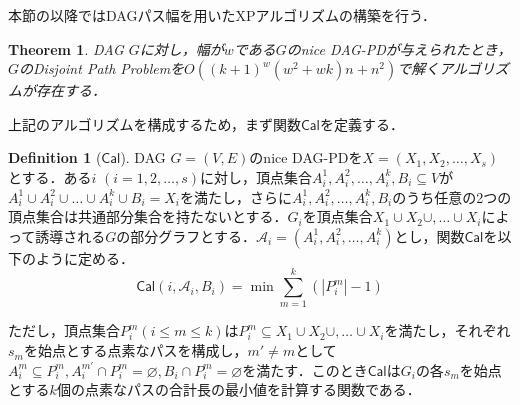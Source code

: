 \documentclass[master]{kuisthesis}		%
\theoremstyle{plain}
\newtheorem{theorem}{Theorem}
\theoremstyle{definition}
\newtheorem{definition*}{Definition}
\begin{document}
本節の以降ではDAGパス幅を用いたXPアルゴリズムの構築を行う．

\begin{theorem}
    DAG $G$に対し，幅が$w$である$G$のnice DAG-PDが与えられたとき，$G$のDisjoint Path Problemを$O((k+1)^w(w^2+wk)n+n^2)$で解くアルゴリズムが存在する．
\end{theorem}

上記のアルゴリズムを構成するため，まず関数$\mathsf{Cal}$を定義する．

\begin{definition*}[$\mathsf{Cal}$]
    DAG $G=(V, E)$のnice DAG-PDを$X=(X_1, X_2, \dots , X_s)$とする．ある$i$ $(i=1, 2, \dots , s)$に対し，頂点集合$A^1_i, A^2_i, \dots , A^k_i, B_i \subseteq V$が$A^1_i \cup A^2_i \cup \dots \cup A^k_i \cup B_i = X_i$を満たし，さらに$A^1_i, A^2_i, \dots ,A^k_i, B_i$のうち任意の2つの頂点集合は共通部分集合を持たないとする．$G_i$を頂点集合$X_1 \cup X_2 \cup,  \dots \cup X_i$によって誘導される$G$の部分グラフとする．$\mathscr{A}_i=(A^1_i, A^2_i, \dots ,A^k_i)$とし，関数$\mathsf{Cal}$を以下のように定める．
    \begin{equation}\label{def_cal}
        \mathsf{Cal}(i, \mathscr{A}_i, B_i) = \min \sum_{m=1}^k (|P^m_i| - 1)
    \end{equation}


    ただし，頂点集合$P^m_i (i\leq m \leq k)$は$P^m_i \subseteq X_1 \cup X_2 \cup,  \dots \cup X_i$を満たし，それぞれ$s_m$を始点とする点素なパスを構成し，$m' \neq m$として$A^m_i \subseteq P^m_i, A^{m'}_i \cap P^m_i = \varnothing, B_i \cap P^m_i = \varnothing$を満たす．このとき$\mathsf{Cal}$は$G_i$の各$s_m$を始点とする$k$個の点素なパスの合計長の最小値を計算する関数である．
\end{definition*}
\end{document}
